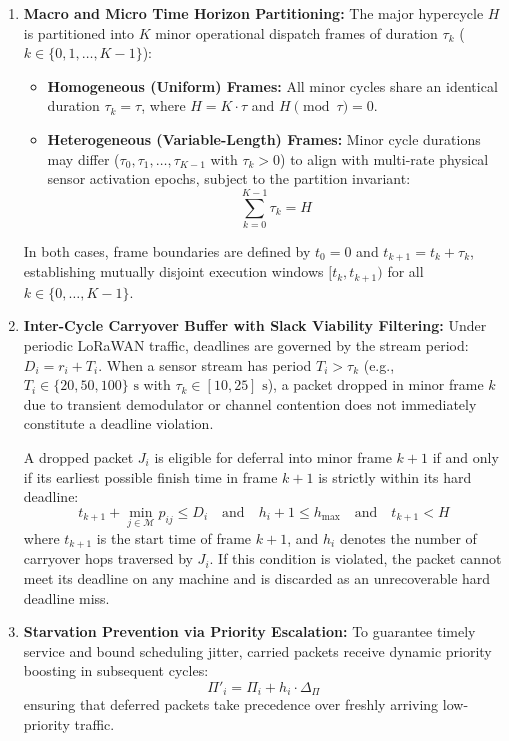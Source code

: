 \documentclass{article}
\begin{document}
\begin{enumerate}
    \item \textbf{Macro and Micro Time Horizon Partitioning:} The major hypercycle $H$ is partitioned into $K$ minor operational dispatch frames of duration $\tau_k$ ($k \in \{0, 1, \dots, K-1\}$):
    \begin{itemize}
        \item \textbf{Homogeneous (Uniform) Frames:} All minor cycles share an identical duration $\tau_k = \tau$, where $H = K \cdot \tau$ and $H \pmod \tau = 0$.
        \item \textbf{Heterogeneous (Variable-Length) Frames:} Minor cycle durations may differ ($\tau_0, \tau_1, \dots, \tau_{K-1}$ with $\tau_k > 0$) to align with multi-rate physical sensor activation epochs, subject to the partition invariant:
        \begin{equation}
        \sum_{k=0}^{K-1} \tau_k = H
        \end{equation}
    \end{itemize}
    In both cases, frame boundaries are defined by $t_0 = 0$ and $t_{k+1} = t_k + \tau_k$, establishing mutually disjoint execution windows $[t_k, t_{k+1})$ for all $k \in \{0, \dots, K-1\}$.
    
    \item \textbf{Inter-Cycle Carryover Buffer with Slack Viability Filtering:} Under periodic LoRaWAN traffic, deadlines are governed by the stream period: $D_i = r_i + T_i$. When a sensor stream has period $T_i > \tau_k$ (e.g., $T_i \in \{20, 50, 100\}\text{ s}$ with $\tau_k \in [10, 25]\text{ s}$), a packet dropped in minor frame $k$ due to transient demodulator or channel contention does not immediately constitute a deadline violation.
    
    A dropped packet $J_i$ is eligible for deferral into minor frame $k+1$ if and only if its earliest possible finish time in frame $k+1$ is strictly within its hard deadline:
    \begin{equation}
    t_{k+1} + \min_{j \in \mathcal{M}} p_{ij} \le D_i \quad \text{and} \quad h_i + 1 \le h_{\max} \quad \text{and} \quad t_{k+1} < H
    \end{equation}
    where $t_{k+1}$ is the start time of frame $k+1$, and $h_i$ denotes the number of carryover hops traversed by $J_i$. If this condition is violated, the packet cannot meet its deadline on any machine and is discarded as an unrecoverable hard deadline miss.
    
    \item \textbf{Starvation Prevention via Priority Escalation:} To guarantee timely service and bound scheduling jitter, carried packets receive dynamic priority boosting in subsequent cycles:
    \begin{equation}
    \Pi'_i = \Pi_i + h_i \cdot \Delta_{\Pi}
    \end{equation}
    ensuring that deferred packets take precedence over freshly arriving low-priority traffic.
\end{enumerate}
\end{document}

